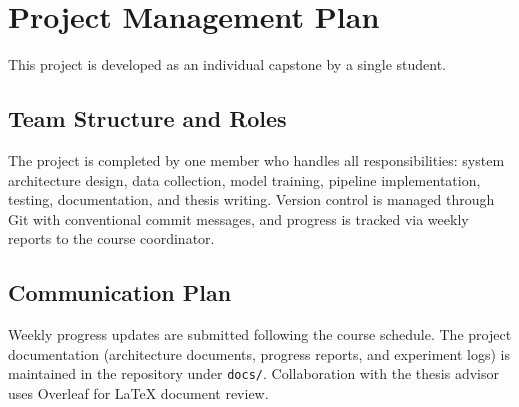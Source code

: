 \section{Project Management Plan}

This project is developed as an individual capstone by a single student.

\subsection{Team Structure and Roles}

The project is completed by one member who handles all responsibilities: system
architecture design, data collection, model training, pipeline implementation,
testing, documentation, and thesis writing. Version control is managed through
Git with conventional commit messages, and progress is tracked via weekly reports
to the course coordinator.

\subsection{Communication Plan}

Weekly progress updates are submitted following the course schedule. The project
documentation (architecture documents, progress reports, and experiment logs) is
maintained in the repository under \texttt{docs/}. Collaboration with the thesis
advisor uses Overleaf for LaTeX document review.